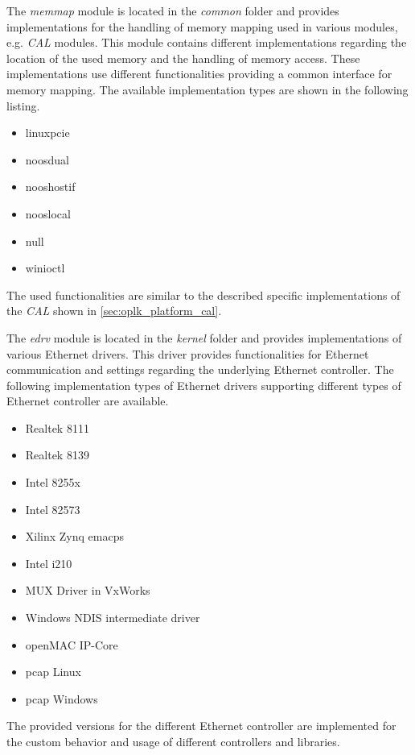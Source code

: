 \begin{description}[leftmargin=1cm]
    \item[memmap] The \emph{memmap} module is located in the \emph{common} folder and provides implementations for the handling of memory mapping used in various modules, e.g. \emph{CAL} modules.
    This module contains different implementations regarding the location of the used memory and the handling of memory access.
    These implementations use different functionalities providing a common interface for memory mapping.
    The available implementation types are shown in the following listing.
    \begin{multicols}{3}
        \begin{itemize}
            \item linuxpcie
            \item noosdual
            \item nooshostif
            \item nooslocal
            \item null
            \item winioctl
        \end{itemize}
    \end{multicols}
    The used functionalities are similar to the described specific implementations of the \emph{CAL} shown in \ref{sec:oplk_platform_cal}.\\
    
    \item[edrv] The \emph{edrv} module is located in the \emph{kernel} folder and provides implementations of various Ethernet drivers.
    This driver provides functionalities for Ethernet communication and settings regarding the underlying Ethernet controller.
    The following implementation types of Ethernet drivers supporting different types of Ethernet controller are available.
    \begin{multicols}{3}
        \begin{itemize}
            \item Realtek 8111
            \item Realtek 8139
            \item Intel 8255x
            \item Intel 82573
            \item Xilinx Zynq emacps
            \item Intel i210
            \item MUX Driver in VxWorks
            \item Windows NDIS intermediate driver
            \item openMAC IP-Core
            \item pcap Linux
            \item pcap Windows
        \end{itemize}
    \end{multicols}
    The provided versions for the different Ethernet controller are implemented for the custom behavior and usage of different controllers and libraries.
    \\
    

\end{description}
